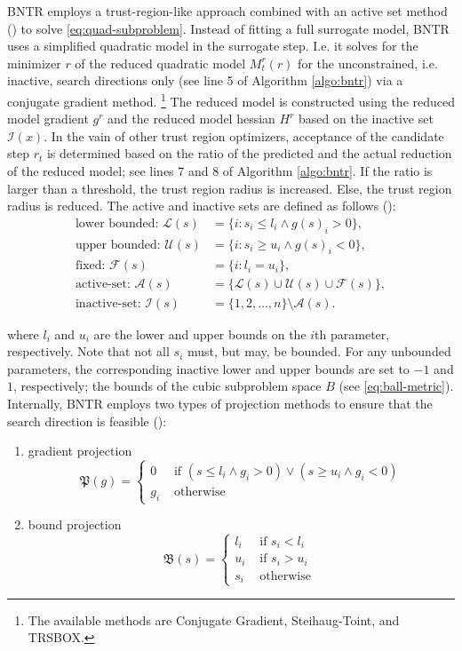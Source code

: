 BNTR employs a trust-region-like approach combined with an active set method (\cite{TAO21}) to solve \ref{eq:quad-subproblem}.
Instead of fitting a full surrogate model, BNTR uses a simplified quadratic model in the surrogate step. I.e. it solves for the minimizer $r$ of the reduced quadratic model $M^{r}_{t}(r)$ for the unconstrained, i.e. inactive, search directions only (see line 5 of Algorithm \ref{algo:bntr}) via a conjugate gradient method. \footnote{The available methods are Conjugate Gradient, Steihaug-Toint, and TRSBOX.}
The reduced model is constructed using the reduced model gradient $g^r$ and the reduced model hessian $H^r$ based on the inactive set $\mathcal{I}(x)$.
In the vain of other trust region optimizers, acceptance of the candidate step $r_t$ is determined based on the ratio of the predicted and the actual reduction of the reduced model; see lines 7 and 8 of Algorithm \ref{algo:bntr}. If the ratio is larger than a threshold, the trust region radius is increased. Else, the trust region radius is reduced.
The active and inactive sets are defined as follows (\cite{Bertsekas1982}):
\begin{align*}
\text{lower bounded: } \mathcal{L}(s) & = \{i: s_i \leq l_i \wedge g(s)_i > 0\}, \\
\text{upper bounded: } \mathcal{U}(s) & = \{i: s_i \geq u_i \wedge g(s)_i < 0\}, \\
\text{fixed: } \mathcal{F}(s) & = \{i: l_i = u_i\}, \\
\text{active-set: } \mathcal{A}(s) & = \{\mathcal{L}(s) \cup \mathcal{U}(s) \cup \mathcal{F}(s)\}, \\
\text{inactive-set: } \mathcal{I}(s) & = \{1,2,\ldots,n\} \setminus \mathcal{A}(s).
\end{align*}

\noindent where $l_i$ and $u_i$ are the lower and upper bounds on the $i$th parameter, respectively. Note that not all $s_i$ must, but may, be bounded. For any unbounded parameters, the corresponding inactive lower and upper bounds are set to $-1$ and $1$, respectively; the bounds of the cubic subproblem space $B$ (see \ref{eq:ball-metric}).
\noindent Internally, BNTR employs two types of projection methods to ensure that the search direction is feasible (\cite{TAO21}):

\begin{enumerate}
    \item gradient projection
    $$
    \mathfrak{P}(g)= \begin{cases}0 & \text { if }\left(s \leq l_i \wedge g_i>0\right) \vee\left(s \geq u_i \wedge g_i<0\right) \\ g_i & \text { otherwise }\end{cases}
    $$
    \item bound projection
    $$
    \mathfrak{B}(s)= \begin{cases}l_i & \text { if } s_i<l_i \\ u_i & \text { if } s_i>u_i \\ s_i & \text { otherwise }\end{cases}
    $$
\end{enumerate}


